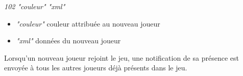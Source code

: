 \par

\textit{102 "couleur" "xml"}

\begin{itemize}

 \item \textit{"couleur"} 	\tabto{2cm} couleur attribuée au nouveau joueur
 
 \item \textit{"xml"}  		\tabto{2cm} données du nouveau joueur \\

\end{itemize} 

Lorsqu'un nouveau joueur rejoint le jeu, une notification de sa présence est envoyée à tous les autres joueurs déjà présents dans le jeu. \\